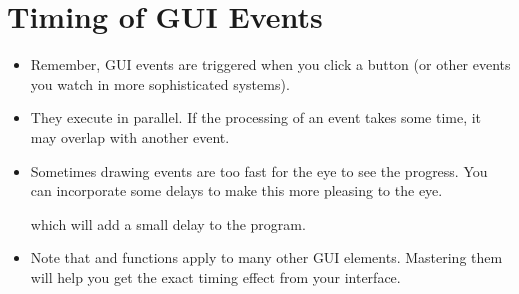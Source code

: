 \documentclass[letterpaper,10pt,english]{sphinxmanual}
\begin{document}
\section{Timing of GUI Events}
\label{\detokenize{lecture_notes/lec22_tkinter:timing-of-gui-events}}\begin{itemize}
\item {} 
Remember, GUI events are triggered when you click a button (or other
events you watch in more sophisticated systems).

\item {} 
They execute in parallel. If the processing of an event takes some
time, it may overlap with another event.

\item {} 
Sometimes drawing events are too fast for the eye to see the progress.
You can incorporate some delays to make this more pleasing to the eye.

%
\begin{sphinxVerbatim}[commandchars=\\\{\}]
\end{sphinxVerbatim}

which will add a small delay  to the program.

\item {} 
Note that  and  functions apply to many other GUI elements.
Mastering them will help you get the exact timing effect from your interface.

\end{itemize}
\end{document}
